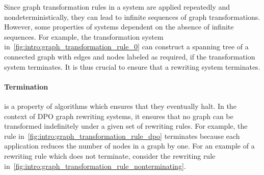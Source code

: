 Since graph transformation rules in a system are applied repeatedly and nondeterministically, they can lead to infinite sequences of graph transformations. However, some properties of systems dependent on the absence of infinite sequences. For example, the transformation system in~\autoref{fig:intro:graph_transformation_rule_0} can construct a spanning tree of a connected graph with edges and nodes labeled as required, if the transformation system terminates. It is thus crucial to ensure that a rewriting system terminates.

\paragraph{Termination} is a property of algorithms which ensures that they eventually halt. In the context of DPO graph rewriting systems, it ensures that no graph can be transformed indefinitely under a given set of rewriting rules. 
For example, the rule in~\autoref{fig:intro:graph_transformation_rule_dpo} terminates because each application reduces the number of nodes in a graph by one. For an example of a rewriting rule which does not terminate, consider the rewriting rule in~\autoref{fig:intro:graph_transformation_rule_nonterminating}. 
